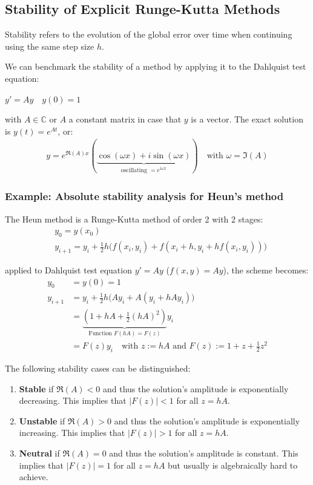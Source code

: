 \subsection{Stability of Explicit Runge-Kutta Methods}

Stability refers to the evolution of the global error over time when
continuing using the same step size $h$.

We can benchmark the stability of a method by applying it to the Dahlquist test equation:

\colorbox{shadecolor}{$
\displaystyle
y' = Ay\quad y(0) = 1
$}

with $A\in\mathbb{C}$ or $A$ a constant matrix in case that $y$ is a vector.
The exact solution is $y(t) = e^{At}$, or:
\begin{align*}
    y = e^{\Re(A)x}\left(
    \underbrace{\cos(\omega x) + i\sin(\omega x)}_{\text{oscillating } = e^{i\omega x}}
    \right)
    \quad\text{with }\omega = \Im(A)
\end{align*}

\subsubsection{Example: Absolute stability analysis for Heun's method}

The Heun method is a Runge-Kutta method of order 2 with 2 stages:
\begin{align*}
    & y_0 = y(x_0) \\
    & y_{i+1}=y_{i}+{\frac{1}{2}}h\bigl(f(x_{i},y_{i})+f(x_{i}+h,y_{i}+h f(x_{i},y_{i}))\bigr)
\end{align*}

applied to Dahlquist test equation $y' = Ay$ {\color{gray}($f(x,y) = Ay$)}, the scheme becomes:
\begin{align*}
    y_0 & = y(0) = 1 \\
    y_{i+1} & = y_{i}+{\frac{1}{2}}h\bigl(Ay_{i}+A(y_i + hAy_i)\bigr) \\
    & = \underbrace{\left( 1+hA+\frac{1}{2}(hA)^2 \right)}_{\text{Function }F(hA)=F(z)}y_i \\
    & = F(z)y_i \quad\text{with }z:=hA\text{ and }F(z):=1+z+\frac{1}{2}z^2
\end{align*}

The following stability cases can be distinguished:
\begin{enumerate}
    \item{
        \textbf{Stable} if $\Re(A) < 0$ and thus the solution's amplitude is exponentially decreasing.
        This implies that \colorbox{shadecolor}{$|F(z)| < 1$} for all $z=hA$.
    }
    \item{
        \textbf{Unstable} if $\Re(A) > 0$ and thus the solution's amplitude is exponentially increasing.
        This implies that \colorbox{shadecolor}{$|F(z)| > 1$} for all $z=hA$.
    }
    \item{
        \textbf{Neutral} if $\Re(A) = 0$ and thus the solution's amplitude is constant.
        This implies that \colorbox{shadecolor}{$|F(z)| = 1$} for all $z=hA$ but usually is algebraically hard to achieve.
    }
\end{enumerate}

